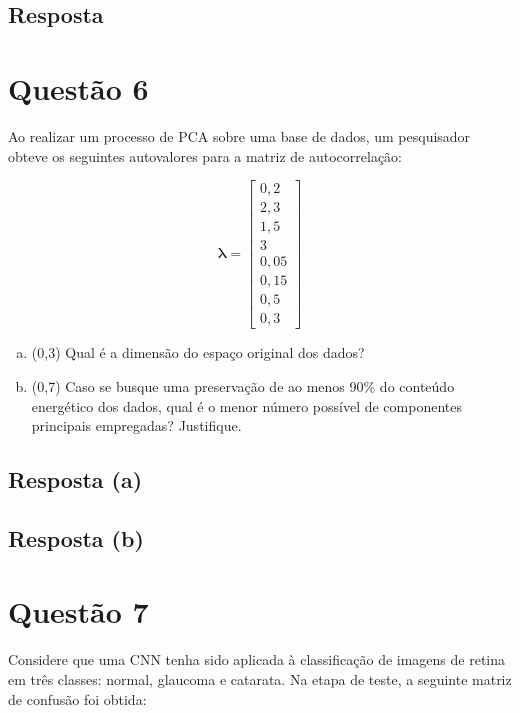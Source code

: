 \documentclass[final,3p]{elsarticle}
\numberwithin{equation}{section}
\begin{document}
    \subsection{Resposta}


\section{Questão 6}

    Ao realizar um processo de PCA sobre uma base de dados, um pesquisador obteve os seguintes autovalores para a matriz de autocorrelação:

    \begin{equation}
        \mathbf{\lambda{}} =
        \begin{bmatrix}
            0,2 \\
            2,3 \\
            1,5 \\
            3 \\
            0,05 \\
            0,15 \\
            0,5 \\
            0,3
        \end{bmatrix}
    \end{equation}

    \begin{enumerate}[(a)]
        \item (0,3) Qual é a dimensão do espaço original dos dados?
        \item (0,7) Caso se busque uma preservação de ao menos 90\% do conteúdo energético dos dados, qual é o menor número possível de componentes principais empregadas? Justifique.
    \end{enumerate}

    \subsection{Resposta \textbf{(a)}}


    \subsection{Resposta \textbf{(b)}}


\section{Questão 7}

    Considere que uma CNN tenha sido aplicada à classificação de imagens de retina em três classes: normal, glaucoma e catarata. Na etapa de teste, a seguinte matriz de confusão foi obtida:
\end{document}
